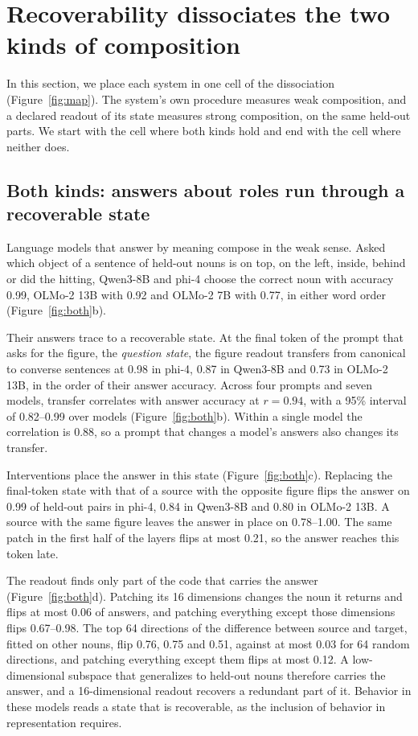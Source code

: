 \section{Recoverability dissociates the two kinds of composition}
\label{sec:results}

In this section, we place each system in one cell of the dissociation (Figure~\ref{fig:map}). The system's own procedure measures weak composition, and a declared readout of its state measures strong composition, on the same held-out parts. We start with the cell where both kinds hold and end with the cell where neither does.

\subsection{Both kinds: answers about roles run through a recoverable state}
\label{sec:behavior}

\CASEBOTH

Language models that answer by meaning compose in the weak sense. Asked which object of a sentence of held-out nouns is on top, on the left, inside, behind or did the hitting, Qwen3-8B and phi-4 choose the correct noun with accuracy 0.99, OLMo-2 13B with 0.92 and OLMo-2 7B with 0.77, in either word order (Figure~\ref{fig:both}b).

Their answers trace to a recoverable state. At the final token of the prompt that asks for the figure, the \emph{question state}, the figure readout transfers from canonical to converse sentences at 0.98 in phi-4, 0.87 in Qwen3-8B and 0.73 in OLMo-2 13B, in the order of their answer accuracy. Across four prompts and seven models, transfer correlates with answer accuracy at $r = 0.94$, with a 95\% interval of 0.82--0.99 over models (Figure~\ref{fig:both}b). Within a single model the correlation is 0.88, so a prompt that changes a model's answers also changes its transfer.

Interventions place the answer in this state (Figure~\ref{fig:both}c). Replacing the final-token state with that of a source with the opposite figure flips the answer on 0.99 of held-out pairs in phi-4, 0.84 in Qwen3-8B and 0.80 in OLMo-2 13B. A source with the same figure leaves the answer in place on 0.78--1.00. The same patch in the first half of the layers flips at most 0.21, so the answer reaches this token late.

The readout finds only part of the code that carries the answer (Figure~\ref{fig:both}d). Patching its 16 dimensions changes the noun it returns and flips at most 0.06 of answers, and patching everything except those dimensions flips 0.67--0.98. The top 64 directions of the difference between source and target, fitted on other nouns, flip 0.76, 0.75 and 0.51, against at most 0.03 for 64 random directions, and patching everything except them flips at most 0.12. A low-dimensional subspace that generalizes to held-out nouns therefore carries the answer, and a 16-dimensional readout recovers a redundant part of it. Behavior in these models reads a state that is recoverable, as the inclusion of behavior in representation requires.

